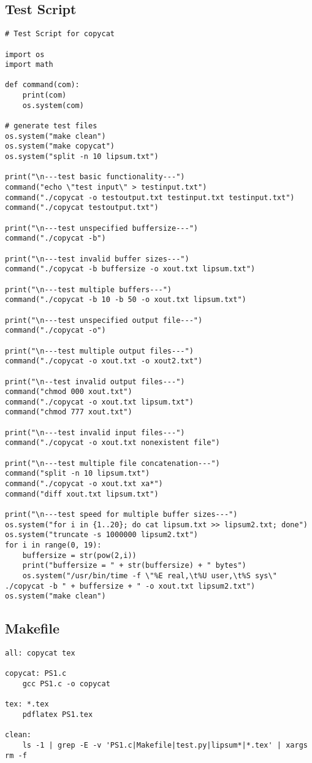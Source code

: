 \documentclass[12pt]{article}
\begin{document}
\subsection{Test Script}
\begin{lstlisting}
# Test Script for copycat

import os
import math

def command(com):
	print(com)
	os.system(com)

# generate test files
os.system("make clean")
os.system("make copycat")
os.system("split -n 10 lipsum.txt")

print("\n---test basic functionality---")
command("echo \"test input\" > testinput.txt")
command("./copycat -o testoutput.txt testinput.txt testinput.txt")
command("./copycat testoutput.txt")

print("\n---test unspecified buffersize---")
command("./copycat -b")

print("\n---test invalid buffer sizes---")
command("./copycat -b buffersize -o xout.txt lipsum.txt")

print("\n---test multiple buffers---")
command("./copycat -b 10 -b 50 -o xout.txt lipsum.txt")

print("\n---test unspecified output file---")
command("./copycat -o")

print("\n---test multiple output files---")
command("./copycat -o xout.txt -o xout2.txt")

print("\n--test invalid output files---")
command("chmod 000 xout.txt")
command("./copycat -o xout.txt lipsum.txt")
command("chmod 777 xout.txt")

print("\n---test invalid input files---")
command("./copycat -o xout.txt nonexistent file")

print("\n---test multiple file concatenation---")
command("split -n 10 lipsum.txt")
command("./copycat -o xout.txt xa*")
command("diff xout.txt lipsum.txt")

print("\n---test speed for multiple buffer sizes---")
os.system("for i in {1..20}; do cat lipsum.txt >> lipsum2.txt; done")
os.system("truncate -s 1000000 lipsum2.txt")
for i in range(0, 19):
	buffersize = str(pow(2,i))
	print("buffersize = " + str(buffersize) + " bytes")
	os.system("/usr/bin/time -f \"%E real,\t%U user,\t%S sys\" ./copycat -b " + buffersize + " -o xout.txt lipsum2.txt")
os.system("make clean")
\end{lstlisting}
\subsection{Makefile}

\begin{lstlisting}
all: copycat tex

copycat: PS1.c
	gcc PS1.c -o copycat

tex: *.tex
	pdflatex PS1.tex

clean:
	ls -1 | grep -E -v 'PS1.c|Makefile|test.py|lipsum*|*.tex' | xargs rm -f
\end{lstlisting}
\end{document}
